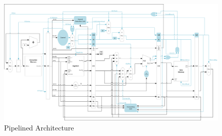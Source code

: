 \documentclass[letter,14pt]{article}
\begin{document}
	\begin{landscape}
	\begin{figure}[H]
	\begin{center}
	\includegraphics[width=1\linewidth]{PipelinedArch.png}
	\caption*{Pipelined Architecture}
	\end{center}
	\end{figure}
	\end{landscape}
\end{document}
